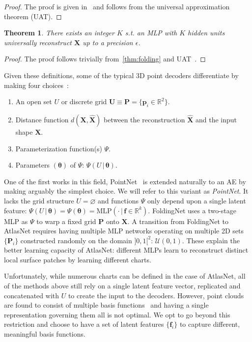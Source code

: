 \documentclass[10pt,twocolumn,letterpaper]{article}
\theoremstyle{break}
\let\emptyset\varnothing
\newcommand{\X}{\mathbf{X}}
\newcommand{\R}{\mathbb{R}}
\newcommand{\Pm}{\mathbf{P}}
\newcommand{\p}{\mathbf{p}}
\newcommand{\f}{\mathbf{f}}
\newcommand{\U}{\mathbf{U}}
\newtheorem{thm}{Theorem}
\begin{document}
\begin{proof}
The proof is given in~\cite{Yang_2018_CVPR} and follows from the universal approximation theorem (UAT).
\end{proof}
\begin{thm}
\label{thm:atlasnet2}
There exists an integer $K$ s.t. an MLP with $K$ hidden units universally reconstruct $\X$ up to a precision $\epsilon$.
\end{thm}
\begin{proof}
The proof follows trivially from~\cref{thm:folding} and UAT~\cite{groueix2018}.
\end{proof}
Given these definitions, some of the typical 3D point decoders differentiate by making four choices~\cite{qi2017pointnet,groueix2018,Yang_2018_CVPR}:
\begin{enumerate}[itemsep=-1ex]
	\item An open set $U$ or discrete grid $\U\equiv\Pm=\{\p_i \in \R^2\}$.
	\item Distance function $d(\X,\hat{\X})$ between the reconstruction $\hat{\X}$ and the input shape $\X$.
	\item Parameterization function(s) $\Psi$.
	\item Parameters $(\bm{\theta})$ of $\Psi$: $\Psi(U\,|\, \bm{\theta})$.
\end{enumerate}

One of the first works in this field, PointNet~\cite{qi2017pointnet} is extended naturally to an AE by~\cite{achlioptas2017latent_pc} making arguably the simplest choice. We will refer to this variant as \textit{PointNet}. It lacks the grid structure $U=\emptyset$ and functions $\Psi$ only depend upon a single latent feature: $\Psi(U\,|\,\bm{\theta})=\Psi(\bm{\theta})=\text{MLP}(\cdot\,|\,\f\in\R^k)$. FoldingNet uses a two-stage MLP as $\Psi$ to warp a fixed grid $\Pm$ onto $\X$. A transition from FoldingNet to AtlasNet requires having multiple MLP networks operating on multiple 2D sets $\{\Pm_i\}$ constructed randomly on the domain $]0,1[^2$: $\bm{\mathcal{U}}(0,1)$. These explain the better learning capacity of AtlasNet: different MLPs learn to reconstruct distinct local surface patches by learning different charts.

Unfortunately, while numerous charts can be defined in the case of AtlasNet, all of the methods above still rely on a single latent feature vector, replicated and concatenated with $U$ to create the input to the decoders. However, point clouds are found to consist of multiple basis functions~\cite{Sung2018} and having a single representation governing them all is not optimal. We opt to go beyond this restriction and choose to have a set of latent features $\{\f_i\}$ to capture different, meaningful basis functions. 
\end{document}
